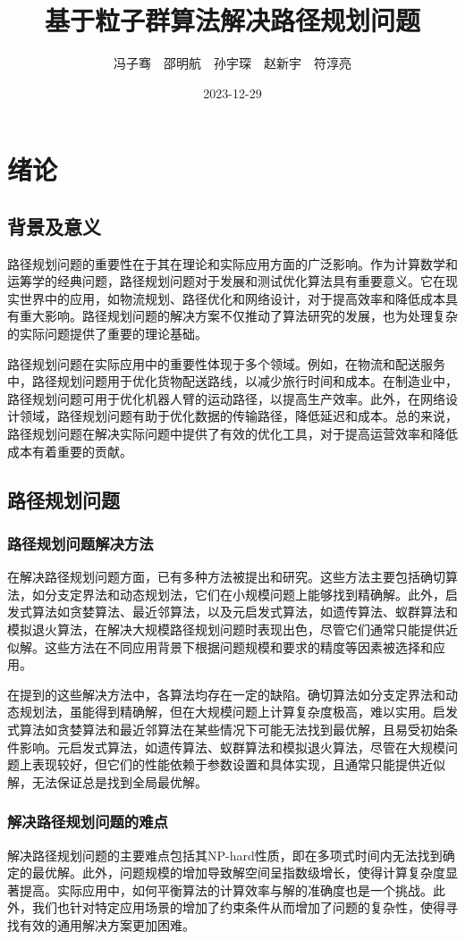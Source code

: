 \documentclass{ctexart}
\title{基于粒子群算法解决路径规划问题}
\author{冯子骞~~邵明航~~孙宇琛~~赵新宇~~符淳亮}
\date{2023-12-29}
\begin{document}
\maketitle
\section{绪论}
\subsection{背景及意义}
路径规划问题的重要性在于其在理论和实际应用方面的广泛影响。作为计算数学和运筹学的经典问题，路径规划问题对于发展和测试优化算法具有重要意义。它在现实世界中的应用，如物流规划、路径优化和网络设计，对于提高效率和降低成本具有重大影响。路径规划问题的解决方案不仅推动了算法研究的发展，也为处理复杂的实际问题提供了重要的理论基础。

路径规划问题在实际应用中的重要性体现于多个领域。例如，在物流和配送服务中，路径规划问题用于优化货物配送路线，以减少旅行时间和成本。在制造业中，路径规划问题可用于优化机器人臂的运动路径，以提高生产效率。此外，在网络设计领域，路径规划问题有助于优化数据的传输路径，降低延迟和成本。总的来说，路径规划问题在解决实际问题中提供了有效的优化工具，对于提高运营效率和降低成本有着重要的贡献。
\subsection{路径规划问题}
\subsubsection{路径规划问题解决方法}
在解决路径规划问题方面，已有多种方法被提出和研究。这些方法主要包括确切算法，如分支定界法和动态规划法，它们在小规模问题上能够找到精确解。此外，启发式算法如贪婪算法、最近邻算法，以及元启发式算法，如遗传算法\cite{ref1}、蚁群算法\cite{ref2}\cite{ref3}和模拟退火算法\cite{ref4}，在解决大规模路径规划问题时表现出色，尽管它们通常只能提供近似解。这些方法在不同应用背景下根据问题规模和要求的精度等因素被选择和应用。

在提到的这些解决方法中，各算法均存在一定的缺陷。确切算法如分支定界法\cite{ref5}和动态规划法\cite{ref6}，虽能得到精确解，但在大规模问题上计算复杂度极高，难以实用。启发式算法如贪婪算法和最近邻算法在某些情况下可能无法找到最优解，且易受初始条件影响。元启发式算法，如遗传算法、蚁群算法和模拟退火算法，尽管在大规模问题上表现较好，但它们的性能依赖于参数设置和具体实现，且通常只能提供近似解，无法保证总是找到全局最优解。
\subsubsection{解决路径规划问题的难点}
解决路径规划问题的主要难点包括其NP-hard性质，即在多项式时间内无法找到确定的最优解\cite{ref7}。此外，问题规模的增加导致解空间呈指数级增长，使得计算复杂度显著提高。实际应用中，如何平衡算法的计算效率与解的准确度也是一个挑战。此外，我们也针对特定应用场景的增加了约束条件从而增加了问题的复杂性，使得寻找有效的通用解决方案更加困难。 
\end{document}
